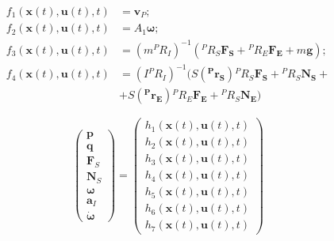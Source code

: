 \begin{subequations}
\begin{align}
	f_1(\boldsymbol{x}(t),\boldsymbol{u}(t),t) &= \boldsymbol{v}_P ; \\
	f_2(\boldsymbol{x}(t),\boldsymbol{u}(t),t) &= A_1\boldsymbol{\omega}; \\
	f_3(\boldsymbol{x}(t),\boldsymbol{u}(t),t) &= (m{^PR_I})^{-1}
		({^PR_S}\boldsymbol{F_S} + {^PR_E}\boldsymbol{F_E} + m\boldsymbol{g}); \\
	f_4(\boldsymbol{x}(t),\boldsymbol{u}(t),t) &= (I {^PR_I})^{-1}
		(S(\boldsymbol{^Pr_S}){^PR_S}\boldsymbol{F_S}+ {^PR_S}\boldsymbol{N_S} +
		\nonumber\\
		 &+ S(\boldsymbol{^Pr_E}){^PR_E}\boldsymbol{F_E} + {^PR_S}\boldsymbol{N_E})
\end{align}
\end{subequations}

\begin{equation}
	\begin{pmatrix}	
	\boldsymbol{p} \\ \boldsymbol{q} \\ \boldsymbol{F}_S \\ 					\boldsymbol{N}_S \\ \boldsymbol{\omega} \\ \boldsymbol{a}_I \\ \boldsymbol{\dot{\omega}}
	\end{pmatrix} = 
	\begin{pmatrix}	
	h_1(\boldsymbol{x}(t),\boldsymbol{u}(t),t) \\
	h_2(\boldsymbol{x}(t),\boldsymbol{u}(t),t) \\
	h_3(\boldsymbol{x}(t),\boldsymbol{u}(t),t) \\
	h_4(\boldsymbol{x}(t),\boldsymbol{u}(t),t) \\
	h_5(\boldsymbol{x}(t),\boldsymbol{u}(t),t) \\
	h_6(\boldsymbol{x}(t),\boldsymbol{u}(t),t) \\
	h_7(\boldsymbol{x}(t),\boldsymbol{u}(t),t)
	\end{pmatrix}
\end{equation}

